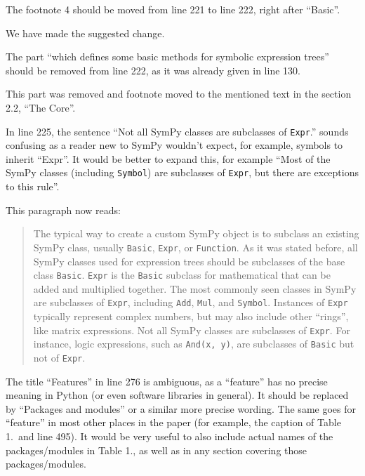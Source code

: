 \documentclass[answers,12pt]{exam}
\begin{document}
\begin{questions}
\question The footnote 4 should be moved from line 221 to line 222, right after ``Basic''.
\label{rev3point16}
\begin{solution}
We have made the suggested change.
\end{solution}

\question The part ``which defines some basic methods for symbolic expression trees'' should be removed from line 222, as it was already given in line 130.
\begin{solution}
This part was removed and footnote moved to the mentioned
text in the section 2.2, ``The Core''.
\end{solution}

\question In line 225, the sentence ``Not all SymPy classes are subclasses of \texttt{Expr}.'' sounds confusing as a reader new to SymPy wouldn't expect, for example, symbols to inherit ``Expr''. It would be better to expand this, for example ``Most of the SymPy classes (including \texttt{Symbol}) are subclasses of \texttt{Expr}, but there are exceptions to this rule''.
\begin{solution}
This paragraph now reads:
\begin{quote}
The typical way to create a custom SymPy object is to subclass an existing
SymPy class, usually \texttt{Basic}, \texttt{Expr}, or \texttt{Function}. As
it was stated before, all SymPy classes used for expression trees should be
subclasses of the base class \texttt{Basic}. \texttt{Expr} is the
\texttt{Basic} subclass for mathematical that can be added and multiplied
together. The most commonly seen classes in SymPy are subclasses of
\texttt{Expr}, including \texttt{Add}, \texttt{Mul}, and \texttt{Symbol}.
Instances of \texttt{Expr} typically represent complex numbers, but may also
include other ``rings'', like matrix expressions. Not all SymPy classes are
subclasses of \texttt{Expr}. For instance, logic expressions, such as
\verb|And(x, y)|, are subclasses of \texttt{Basic} but not of \texttt{Expr}.
\end{quote}
\end{solution}

\question The title ``Features'' in line 276 is ambiguous, as a ``feature''
has no precise meaning in Python (or even software libraries in general). It
should be replaced by ``Packages and modules'' or a similar more precise
wording. The same goes for ``feature'' in most other places in the paper (for
example, the caption of Table 1.\ and line 495). It would be very useful to also include actual names of the packages/modules in Table 1., as well as in any section covering those packages/modules.
\begin{solution}


\end{solution}
\end{questions}
\end{document}
